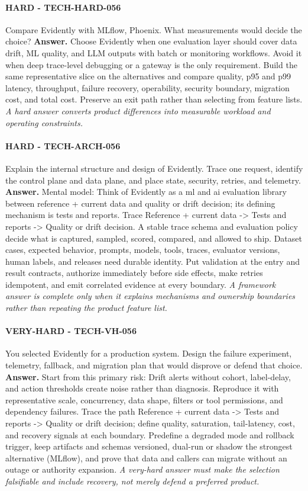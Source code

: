 \paragraph{HARD - TECH-HARD-056} Compare Evidently with MLflow, Phoenix. What measurements would decide the choice?
\textbf{Answer.} Choose Evidently when one evaluation layer should cover data drift, ML quality, and LLM outputs with batch or monitoring workflows. Avoid it when deep trace-level debugging or a gateway is the only requirement. Build the same representative slice on the alternatives and compare quality, p95 and p99 latency, throughput, failure recovery, operability, security boundary, migration cost, and total cost. Preserve an exit path rather than selecting from feature lists.
\textit{A hard answer converts product differences into measurable workload and operating constraints.}
\paragraph{HARD - TECH-ARCH-056} Explain the internal structure and design of Evidently. Trace one request, identify the control plane and data plane, and place state, security, retries, and telemetry.
\textbf{Answer.} Mental model: Think of Evidently as a ml and ai evaluation library between reference + current data and quality or drift decision; its defining mechanism is tests and reports. Trace Reference + current data -> Tests and reports -> Quality or drift decision. A stable trace schema and evaluation policy decide what is captured, sampled, scored, compared, and allowed to ship. Dataset cases, expected behavior, prompts, models, tools, traces, evaluator versions, human labels, and releases need durable identity. Put validation at the entry and result contracts, authorize immediately before side effects, make retries idempotent, and emit correlated evidence at every boundary.
\textit{A framework answer is complete only when it explains mechanisms and ownership boundaries rather than repeating the product feature list.}
\paragraph{VERY-HARD - TECH-VH-056} You selected Evidently for a production system. Design the failure experiment, telemetry, fallback, and migration plan that would disprove or defend that choice.
\textbf{Answer.} Start from this primary risk: Drift alerts without cohort, label-delay, and action thresholds create noise rather than diagnosis. Reproduce it with representative scale, concurrency, data shape, filters or tool permissions, and dependency failures. Trace the path Reference + current data -> Tests and reports -> Quality or drift decision; define quality, saturation, tail-latency, cost, and recovery signals at each boundary. Predefine a degraded mode and rollback trigger, keep artifacts and schemas versioned, dual-run or shadow the strongest alternative (MLflow), and prove that data and callers can migrate without an outage or authority expansion.
\textit{A very-hard answer must make the selection falsifiable and include recovery, not merely defend a preferred product.}
